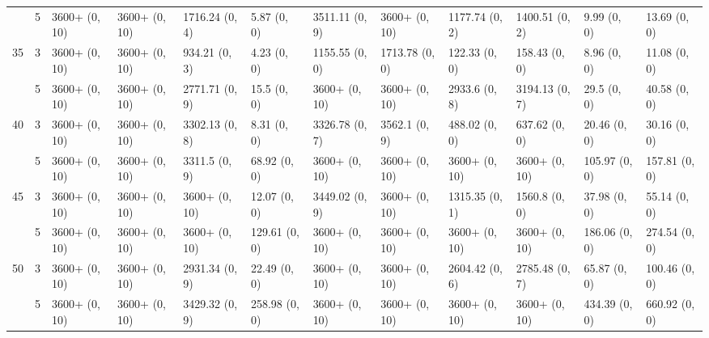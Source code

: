 \documentclass{article}
\begin{document}
\begin{table}
{\begin{tabular}{llllllllllll}
 & 5 & 3600+ (0, 10) & 3600+ (0, 10) & 1716.24 (0, 4) & 5.87 (0, 0) & 3511.11 (0, 9) & 3600+ (0, 10) & 1177.74 (0, 2) & 1400.51 (0, 2) & 9.99 (0, 0) & 13.69 (0, 0) \\
\cline{1-12}
\multirow[t]{2}{*}{35} & 3 & 3600+ (0, 10) & 3600+ (0, 10) & 934.21 (0, 3) & 4.23 (0, 0) & 1155.55 (0, 0) & 1713.78 (0, 0) & 122.33 (0, 0) & 158.43 (0, 0) & 8.96 (0, 0) & 11.08 (0, 0) \\
 & 5 & 3600+ (0, 10) & 3600+ (0, 10) & 2771.71 (0, 9) & 15.5 (0, 0) & 3600+ (0, 10) & 3600+ (0, 10) & 2933.6 (0, 8) & 3194.13 (0, 7) & 29.5 (0, 0) & 40.58 (0, 0) \\
\cline{1-12}
\multirow[t]{2}{*}{40} & 3 & 3600+ (0, 10) & 3600+ (0, 10) & 3302.13 (0, 8) & 8.31 (0, 0) & 3326.78 (0, 7) & 3562.1 (0, 9) & 488.02 (0, 0) & 637.62 (0, 0) & 20.46 (0, 0) & 30.16 (0, 0) \\
 & 5 & 3600+ (0, 10) & 3600+ (0, 10) & 3311.5 (0, 9) & 68.92 (0, 0) & 3600+ (0, 10) & 3600+ (0, 10) & 3600+ (0, 10) & 3600+ (0, 10) & 105.97 (0, 0) & 157.81 (0, 0) \\
\cline{1-12}
\multirow[t]{2}{*}{45} & 3 & 3600+ (0, 10) & 3600+ (0, 10) & 3600+ (0, 10) & 12.07 (0, 0) & 3449.02 (0, 9) & 3600+ (0, 10) & 1315.35 (0, 1) & 1560.8 (0, 0) & 37.98 (0, 0) & 55.14 (0, 0) \\
 & 5 & 3600+ (0, 10) & 3600+ (0, 10) & 3600+ (0, 10) & 129.61 (0, 0) & 3600+ (0, 10) & 3600+ (0, 10) & 3600+ (0, 10) & 3600+ (0, 10) & 186.06 (0, 0) & 274.54 (0, 0) \\
\cline{1-12}
\multirow[t]{2}{*}{50} & 3 & 3600+ (0, 10) & 3600+ (0, 10) & 2931.34 (0, 9) & 22.49 (0, 0) & 3600+ (0, 10) & 3600+ (0, 10) & 2604.42 (0, 6) & 2785.48 (0, 7) & 65.87 (0, 0) & 100.46 (0, 0) \\
 & 5 & 3600+ (0, 10) & 3600+ (0, 10) & 3429.32 (0, 9) & 258.98 (0, 0) & 3600+ (0, 10) & 3600+ (0, 10) & 3600+ (0, 10) & 3600+ (0, 10) & 434.39 (0, 0) & 660.92 (0, 0) \\
\cline{1-12}
\bottomrule
\end{tabular}}
\end{table}
\end{document}
